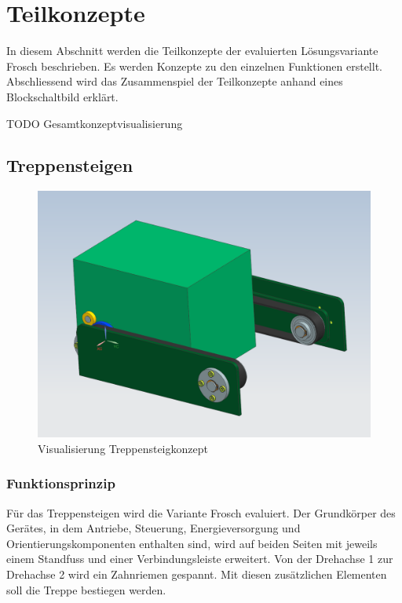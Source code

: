 \section{Teilkonzepte}
In diesem Abschnitt werden die Teilkonzepte der evaluierten Lösungsvariante \glqq Frosch\grqq{} beschrieben. Es werden Konzepte zu den einzelnen Funktionen erstellt. Abschliessend wird das Zusammenspiel der Teilkonzepte anhand eines Blockschaltbild erklärt.

TODO Gesamtkonzeptvisualisierung

\subsection{Treppensteigen}

\begin{figure}[H]
  \includegraphics[width=1\textwidth]{img/Treppensteigen/Geraetansicht.PNG}
  \centering
  \caption{Visualisierung Treppensteigkonzept}
\end{figure}

\newpage


\subsubsection{Funktionsprinzip}
Für das Treppensteigen wird die Variante \glqq Frosch \grqq{} evaluiert. Der Grundkörper des Gerätes, in dem Antriebe, Steuerung, Energieversorgung und Orientierungskomponenten enthalten sind, wird auf beiden Seiten mit jeweils einem Standfuss und einer Verbindungsleiste erweitert. Von der Drehachse 1 zur Drehachse 2 wird ein Zahnriemen gespannt. Mit diesen zusätzlichen Elementen soll die Treppe bestiegen werden.

